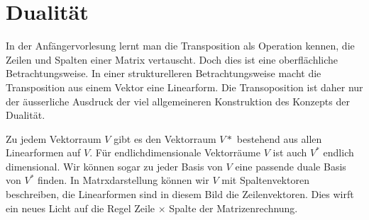 %
%
%
\chapter{Dualität}
In der Anfängervorlesung lernt man die Transposition als Operation kennen,
die Zeilen und Spalten einer Matrix vertauscht.
Doch dies ist eine oberflächliche Betrachtungsweise.
In einer strukturelleren Betrachtungsweise macht die Transposition
aus einem Vektor eine Linearform.
Die Transoposition ist daher nur der äusserliche Ausdruck der viel
allgemeineren Konstruktion des Konzepts der Dualität.

Zu jedem Vektorraum $V$ gibt es den Vektorraum $V*$ bestehend aus
allen Linearformen auf $V$.
Für endlichdimensionale Vektorräume $V$ ist auch $V^*$ endlich dimensional.
Wir können sogar zu jeder Basis von $V$ eine passende duale Basis von
$V^*$ finden.
In Matrxdarstellung können wir $V$ mit Spaltenvektoren beschreiben,
die Linearformen sind in diesem Bild die Zeilenvektoren.
Dies wirft ein neues Licht auf die Regel Zeile $\times$ Spalte der
Matrizenrechnung.








